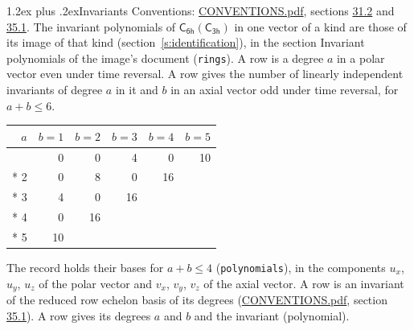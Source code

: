\documentclass[10pt,a4paper]{article}
\makeatletter
\renewcommand\section{\@startsection{section}{1}{\z@}{-3ex plus -1ex minus -.2ex}%
  {1.2ex plus .2ex}{\normalfont\large\sffamily\bfseries\color{parttitle}}}
\numberwithin{equation}{section}
\newcommand{\grp}[1]{\mathsf{#1}}
\makeatother
\begin{document}
\section{Invariants}\label{s:invariants}
Conventions: \href{../../CONVENTIONS.pdf}{CONVENTIONS.pdf}, sections \href{../../CONVENTIONS.pdf\#conv.31.2}{31.2} and \href{../../CONVENTIONS.pdf\#conv.35.1}{35.1}.
The invariant polynomials of $\grp{C_{6h}}(\grp{C_{3h}})$ in one vector of a kind are those of its image of that kind (section~\ref{s:identification}), in the section Invariant polynomials of the image's document (\texttt{rings}).
\leavevmode\label{n:index.degree.polar}\label{n:index.degree.axial}A row is a degree $a$ in a polar vector even under time reversal. A row gives the number of linearly independent invariants of degree $a$ in it and $b$ in an axial vector odd under time reversal, for $a + b \le 6$.
{\small\begin{longtable}{@{}rrrrrr@{}}\toprule
$a$ & $b = 1$ & $b = 2$ & $b = 3$ & $b = 4$ & $b = 5$\\\midrule\endhead
\bottomrule\endfoot\endlastfoot
1 & 0 & 0 & 4 & 0 & 10\\*
2 & 0 & 8 & 0 & 16 & \\*
3 & 4 & 0 & 16 &  & \\*
4 & 0 & 16 &  &  & \\*
5 & 10 &  &  &  & \\
\bottomrule\end{longtable}}
\leavevmode\label{n:local.component.polar}\label{n:local.component.axial}The record holds their bases for $a + b \le 4$ (\texttt{polynomials}), in the components $u_{x}$, $u_{y}$, $u_{z}$ of the polar vector and $v_{x}$, $v_{y}$, $v_{z}$ of the axial vector. \label{n:head.polynomial}A row is an invariant of the reduced row echelon basis of its degrees (\href{../../CONVENTIONS.pdf}{CONVENTIONS.pdf}, section \href{../../CONVENTIONS.pdf\#conv.35.1}{35.1}). A row gives its degrees $a$ and $b$ and the invariant (polynomial).
\end{document}
